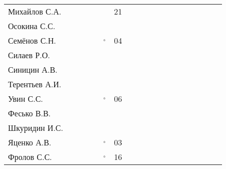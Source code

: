 \documentclass[a4paper,11pt]{article}
\newcommand*\OK{&\small \ding{51}$\!\!_\circ$} %
\newcommand*\ok{&{\small \ding{51}}} %
\newcommand*\no{&{\small }} %
\begin{document}
\begin{tabular}{l|cccccccccccccccccc}
Михайлов С.А.   \no\no\ok\ok\ok&21&&&&&&&&&&&&\\
Осокина С.С.    \ok\ok\ok\ok\no\no&&&&&&&&&&&&\\
Семёнов С.Н.    \ok\ok\ok\ok\OK&04&&&&&&&&&&&&\\
Силаев Р.О.     \ok\ok\no\no\no\no&&&&&&&&&&&&\\
Синицин А.В.    \ok\ok\no\ok\no\no&&&&&&&&&&&&\\
Терентьев А.И.  \ok\ok\ok\ok\no\no&&&&&&&&&&&&\\
Увин С.С.       \ok\ok\ok\ok\OK&06&&&&&&&&&&&&\\
Фесько В.В.     \no\no\no\no\no\no&&&&&&&&&&&&\\
Шкуридин И.С.   \ok\ok\ok\ok\ok\no&&&&&&&&&&&&\\
Яценко А.В.     \ok\ok\ok\ok\OK&03&&&&&&&&&&&&\\
Фролов С.С.     \ok\ok\ok\ok\OK&16&&&&&&&&&&&&\\ 
\bottomrule
\end{tabular} 
\end{document}
